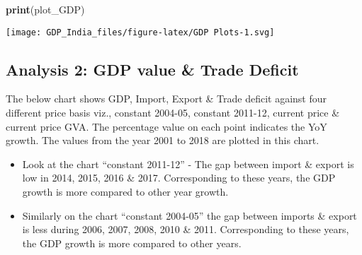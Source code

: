 \documentclass[]{article}
\newenvironment{Shaded}{\begin{snugshade}}{\end{snugshade}}
\newcommand{\KeywordTok}[1]{\textcolor[rgb]{0.13,0.29,0.53}{\textbf{#1}}}
\newcommand{\NormalTok}[1]{#1}
\begin{document}
\begin{Shaded}
\begin{Highlighting}[]
\KeywordTok{print}\NormalTok{(plot_GDP)}
\end{Highlighting}
\end{Shaded}

\texttt{[image: GDP\_India\_files/figure-latex/GDP Plots-1.svg]}

\hypertarget{analysis-2-gdp-value-trade-deficit}{%
\subsection{Analysis 2: GDP value \& Trade
Deficit}\label{analysis-2-gdp-value-trade-deficit}}

The below chart shows GDP, Import, Export \& Trade deficit against four
different price basis viz., constant 2004-05, constant 2011-12, current
price \& current price GVA. The percentage value on each point indicates
the YoY growth. The values from the year 2001 to 2018 are plotted in
this chart.

\begin{itemize}
\item
  Look at the chart ``constant 2011-12'' - The gap between import \&
  export is low in 2014, 2015, 2016 \& 2017. Corresponding to these
  years, the GDP growth is more compared to other year growth.
\item
  Similarly on the chart ``constant 2004-05'' the gap between imports \&
  export is less during 2006, 2007, 2008, 2010 \& 2011. Corresponding to
  these years, the GDP growth is more compared to other years.
\end{itemize}
\end{document}
